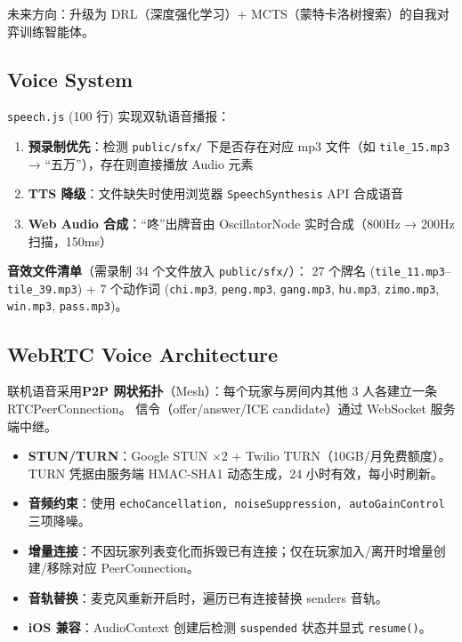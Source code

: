 \documentclass[11pt,a4paper]{article}
\begin{document}
未来方向：升级为 DRL（深度强化学习）+ MCTS（蒙特卡洛树搜索）的自我对弈训练智能体。

\subsection{Voice System}

\texttt{speech.js} (100 行) 实现双轨语音播报：

\begin{enumerate}[nosep]
  \item \textbf{预录制优先}：检测 \texttt{public/sfx/} 下是否存在对应 mp3 文件（如 \texttt{tile\_15.mp3} → ``五万''），存在则直接播放 Audio 元素
  \item \textbf{TTS 降级}：文件缺失时使用浏览器 \texttt{SpeechSynthesis} API 合成语音
  \item \textbf{Web Audio 合成}：``咚''出牌音由 OscillatorNode 实时合成（800Hz → 200Hz 扫描，150ms）
\end{enumerate}

\textbf{音效文件清单}（需录制 34 个文件放入 \texttt{public/sfx/}）：
27 个牌名 (\texttt{tile\_11.mp3}--\texttt{tile\_39.mp3}) + 7 个动作词 (\texttt{chi.mp3}, \texttt{peng.mp3}, \texttt{gang.mp3}, \texttt{hu.mp3}, \texttt{zimo.mp3}, \texttt{win.mp3}, \texttt{pass.mp3})。

\subsection{WebRTC Voice Architecture}

联机语音采用\textbf{P2P 网状拓扑}（Mesh）：每个玩家与房间内其他 3 人各建立一条 RTCPeerConnection。
信令（offer/answer/ICE candidate）通过 WebSocket 服务端中继。

\begin{itemize}[nosep]
  \item \textbf{STUN/TURN}：Google STUN ×2 + Twilio TURN（10GB/月免费额度）。
  TURN 凭据由服务端 HMAC-SHA1 动态生成，24 小时有效，每小时刷新。
  \item \textbf{音频约束}：使用 \texttt{echoCancellation, noiseSuppression, autoGainControl} 三项降噪。
  \item \textbf{增量连接}：不因玩家列表变化而拆毁已有连接；仅在玩家加入/离开时增量创建/移除对应 PeerConnection。
  \item \textbf{音轨替换}：麦克风重新开启时，遍历已有连接替换 senders 音轨。
  \item \textbf{iOS 兼容}：AudioContext 创建后检测 \texttt{suspended} 状态并显式 \texttt{resume()}。
\end{itemize}
\end{document}
